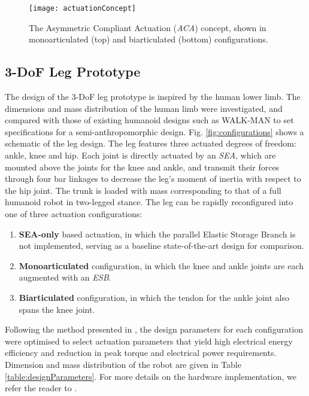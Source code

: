 \documentclass[letterpaper, 10 pt, conference]{ieeeconf}  %
\begin{document}
\begin{figure}[ht]
	\centering
	\texttt{[image: actuationConcept]}
	\caption{The Asymmetric Compliant Actuation (\textit{ACA}) concept, shown in monoarticulated (top) and biarticulated (bottom) configurations.}
	\label{fig:ACA}
\end{figure}

\subsection{3-DoF Leg Prototype}
The design of the 3-DoF leg prototype is inspired by the human lower limb. The dimensions and mass distribution of the human limb were investigated, and compared with those of existing humanoid designs such as WALK-MAN \cite{tsagarakis2017walk} to set specifications for a semi-anthropomorphic design. Fig. \ref{fig:configurations} shows a schematic of the leg design. The leg features three actuated degrees of freedom: ankle, knee and hip. Each joint is directly actuated by an \textit{SEA}, which are mounted above the joints for the knee and ankle, and transmit their forces through four bar linkages to decrease the leg’s moment of inertia with respect to the hip joint. The trunk is loaded with mass corresponding to that of a full humanoid robot in two-legged stance. The leg can be rapidly reconfigured into one of three actuation configurations:

\begin{enumerate}
	\item \textbf{SEA-only} based actuation, in which the parallel Elastic Storage Branch is not implemented, serving as a baseline state-of-the-art design for comparison.
	\item \textbf{Monoarticulated} configuration, in which the knee and ankle joints are each augmented with an \textit{ESB}.
	\item \textbf{Biarticulated} configuration, in which the tendon for the ankle joint also spans the knee joint.
\end{enumerate}

 Following the method presented in \cite{roozing2016design}, the design parameters for each configuration were optimised to select actuation parameters that yield high electrical energy efficiency and reduction in peak torque and electrical power requirements. Dimension and mass distribution of the robot are given in Table \ref{table:designParameters}. For more details on the hardware implementation, we refer the reader to \cite{roozing_design_2018}.
\end{document}
